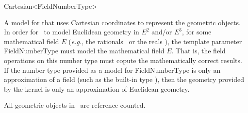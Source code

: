\begin{ccRefClass}{Cartesian<FieldNumberType>}

\ccDefinition
A model for  that uses Cartesian coordinates to represent the
geometric objects.  In order for \ccRefName\ to model Euclidean geometry
in $E^2$ and/or $E^3$, for some mathematical field $E$ (\textit{e.g.},
the rationals \Q\ or the reals \R), the template parameter FieldNumberType 
must model the mathematical field $E$.  That is, the field operations on this
number type must copute the mathematically correct results.  If the number 
type provided as a model for FieldNumberType is only an approximation of a 
field (such as the built-in type ), then the geometry provided by 
the kernel is only an approximation of Euclidean geometry.  

\ccIsModel
{}

\ccTypes
{}
\ccGlue
{}

\ccImplementation
All geometric objects in \ccRefName\ are reference counted.

\ccSeeAlso
{}  \\
 \\
 \\

\end{ccRefClass}
